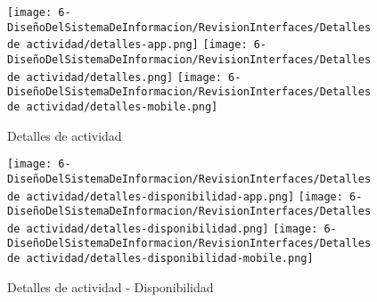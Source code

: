 \begin{figure}[H]
	\centering
	\texttt{[image: 6-DiseñoDelSistemaDeInformacion/RevisionInterfaces/Detalles de actividad/detalles-app.png]}
	\texttt{[image: 6-DiseñoDelSistemaDeInformacion/RevisionInterfaces/Detalles de actividad/detalles.png]}
	\texttt{[image: 6-DiseñoDelSistemaDeInformacion/RevisionInterfaces/Detalles de actividad/detalles-mobile.png]}
	\caption{Detalles de actividad}
\end{figure}

\begin{figure}[H]
	\centering
	\texttt{[image: 6-DiseñoDelSistemaDeInformacion/RevisionInterfaces/Detalles de actividad/detalles-disponibilidad-app.png]}
	\texttt{[image: 6-DiseñoDelSistemaDeInformacion/RevisionInterfaces/Detalles de actividad/detalles-disponibilidad.png]}
	\texttt{[image: 6-DiseñoDelSistemaDeInformacion/RevisionInterfaces/Detalles de actividad/detalles-disponibilidad-mobile.png]}
	\caption{Detalles de actividad - Disponibilidad}
\end{figure}